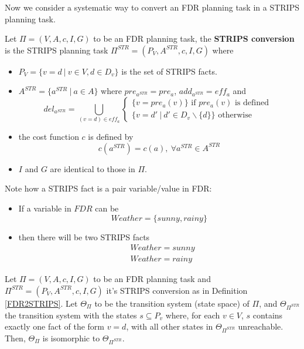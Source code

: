 \documentclass[10pt, letterpaper]{report}
\begin{document}
 Now we consider a systematic way to convert an FDR planning task in a STRIPS planning task.
 \begin{definition}\label{FDR2STRIPS}
    Let $\Pi=(V,A,c,I,G)$ to be an FDR planning task, the \textbf{STRIPS conversion} is the STRIPS planning task $\Pi^{STR}=(P_V,A^{STR},c,I,G)$ where \end{definition}\begin{itemize}
        \item $P_V=\{v=d \ | \ v\in V,d\in D_v\}$ is the set of STRIPS facts. 
        \item $A^{STR}=\{a^{STR} \ | \ a\in A\}$ where $pre_{a^{STR}}=pre_a$, $add_{a^{STR}}=eff_a$ and\begin{equation}
            del_{a^{STR}}=\bigcup_{(v=d)\in eff_a}\begin{cases}
                \{v=pre_a(v)\} \text{ if }pre_a(v) \text{ is defined }\\ 
                \{v=d' \ | \ d'\in D_v\backslash \{d\}\} \text{ otherwise}
            \end{cases}
        \end{equation}
        \item the cost function $c$ is defined by $$c(a^{STR})=c(a),\ \forall a^{STR}\in A^{STR} $$
        \item $I$ and $G$ are identical to those in $\Pi$.
    \end{itemize}
Note how a STRIPS fact is a pair variable/value in FDR:\begin{itemize}
    \item If a variable in $FDR$ can be $$ Weather=\{sunny, rainy\}$$
    \item then there will be two STRIPS facts\begin{align*}
        &Weather=sunny\\ 
        &Weather=rainy
    \end{align*}
\end{itemize}
\begin{proposition}
    Let $\Pi=(V,A,c,I,G)$ to be an FDR planning task and $\Pi^{STR}=(P_V,A^{STR},c,I,G)$ it's STRIPS conversion as in Definition \ref{FDR2STRIPS}. Let $\Theta_\Pi$ to be the transition system (state  space) of $\Pi$, and $\Theta_{\Pi^{STR}}$ the transition system with the states $s\subseteq P_v$ where, for each $v\in V$, $s$ contains exactly one fact of the form $v=d$, with all other states in $\Theta_{\Pi^{STR}}$ unreachable. Then, $\Theta_\Pi$ is isomorphic to  $\Theta_{\Pi^{STR}}$.
\end{proposition}
\end{document}
